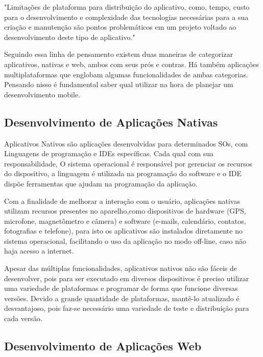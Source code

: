 \begin{citacao}
	"Limitações de plataforma para distribuição do aplicativo, como, tempo, custo para o desenvolvimento e complexidade das tecnologias necessárias para a sua criação e manutenção são pontos problemáticos em um projeto voltado ao desenvolvimento deste tipo de aplicativo."\cite{emdesafios}
\end{citacao}

Seguindo essa linha de pensamento existem duas maneiras de categorizar
aplicativos, nativas e web, ambos com seus prós e contras. Há também aplicações multiplataformas que englobam algumas funcionalidades de ambas categorias. Pensando nisso é fundamental saber qual utilizar na hora de planejar um desenvolvimento mobile.

\subsection{Desenvolvimento de Aplicações Nativas}

Aplicativos Nativos são aplicações desenvolvidas para determinados SOs, com Linguagens de programação e IDEs específicas. Cada qual com sua responsabilidade, O sistema operacional é responsável por gerenciar os recursos do dispositivo, a linguagem é utilizada na programação do software e o IDE dispõe ferramentas que ajudam na programação da aplicação.

Com a finalidade de melhorar a interação com o usuário, aplicações nativas utilizam recursos presentes no aparelho,como dispositivos de hardware (GPS, microfone, magnetômetro e câmera) e software (e-mails,  calendário, contatos, fotografias e telefone), para isto os aplicativos são instalados diretamente no sistema operacional, facilitando o uso da aplicação no modo off-line, caso não haja acesso a internet.\cite{toledo2016desenvolvimento}

Apesar das múltiplas funcionalidades, aplicativos nativos não são fáceis de desenvolver, pois para ser executado em diversos dispositivos é preciso utilizar uma variedade de plataformas e programar de forma que funcione diversas versões. Devido a grande quantidade de plataformas, mantê-lo atualizado é desvantajoso, pois faz-se necessário uma variedade de teste e distribuição para cada versão.

\subsection{Desenvolvimento de Aplicações Web}

